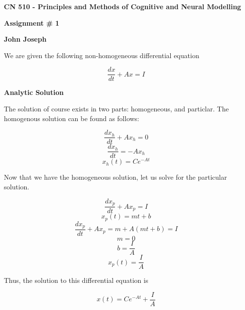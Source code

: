\documentclass[a4paper,12pt]{article}
\begin{document}
\begin{center}
{\Large\bf CN 510 - Principles and Methods of Cognitive and Neural Modelling}

\bigskip

{\large\bf Assignment \# 1}
\smallskip

{\large\bf John Joseph}
\end{center}

We are given the following non-homogeneous differential equation

\begin{equation}
\frac{dx}{dt} + Ax = I
\end{equation}

\bigskip
{\bf Analytic Solution}
\bigskip

The solution of course exists in two parts: homogeneous, and particlar. The homogenous solution can be found as follows:

\begin{equation}
\frac{dx_h}{dt} + Ax_h = 0
\end{equation}
\begin{equation}
\frac{dx_h}{dt} = -Ax_h
\end{equation}
\begin{equation}
x_h(t) = Ce^{-At}
\end{equation}

Now that we have the homogeneous solution, let us solve for the particular solution. 

\begin{equation}
\frac{dx_p}{dt} + Ax_p = I
\end{equation}
\begin{equation}
x_p(t) = mt+b
\end{equation}
\begin{equation}
\frac{dx_p}{dt} + Ax_p = m + A(mt+b) = I
\end{equation}
\begin{equation}
m = 0
\end{equation}
\begin{equation}
b = \frac{I}{A}
\end{equation}
\begin{equation}
x_p(t) = \frac{I}{A}
\end{equation}

Thus, the solution to this differential equation is

\begin{equation}
x(t) = Ce^{-At} + \frac{I}{A}
\end{equation}
\end{document}
